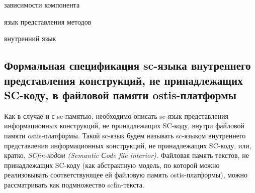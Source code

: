 \begin{SCn}
\begin{scnrelfromset}{зависимости компонента}
\end{scnrelfromset}
\begin{scnrelfromlist}{язык представления методов}
\end{scnrelfromlist}
\begin{scnrelfromlist}{внутренний язык}
\end{scnrelfromlist}
\end{SCn}

\subsection{Формальная спецификация sc-языка внутреннего представления конструкций, не принадлежащих SC-коду, в файловой памяти ostis-платформы}
\label{sec_soft_platform_scfin_code}

Как в случае и с sc-памятью, необходимо описать sc-язык представления информационных конструкций, не принадлежащих SC-коду, внутри файловой памяти ostis-платформы. Такой sc-язык будем называть sc-языком внутреннего представления информационных конструкций, не принадлежащих SC-коду, или, кратко, \textit{SCfin-кодом (Semantic Сode file interior)}. Файловая память текстов, не принадлежащих SC-коду (как абстрактную модель, по которой можно реализовывать соответствующее ей файловую память ostis-платформы), можно рассматривать как подмножество scfin-текста.

\begin{SCn}
\begin{scnindent}
\end{scnindent}
\end{SCn}

